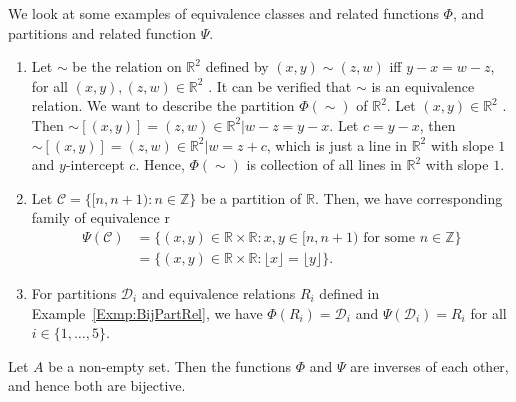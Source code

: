\documentclass[a4paper,english,12pt]{article}
\begin{document}
\begin{exmp} We look at some examples of equivalence classes and related functions $\Phi$, and partitions and related function $\Psi$.
	\begin{enumerate}
		\item Let $\sim$ be the relation on $\mathbb{R}^2$ defined by $(x, y) \sim (z, w)$ iff $y-x =
w-z$, for all $(x, y), (z, w) \in \mathbb{R}^2$ . It can be verified that $\sim$ is an equivalence relation. We
want to describe the partition $\Phi(\sim)$ of $\mathbb{R}^2$. Let $(x, y) \in \mathbb{R}^2$ . Then $\sim[(x, y)] = {(z, w) \in \mathbb{R}^2 | w − z = y − x}$. Let $c = y − x$, then $\sim[(x, y)] = {(z, w) \in \mathbb{R}^2 | w = z + c}$, which is just a line in $\mathbb{R}^2$ with slope $1$ and $y$-intercept $c$. Hence, $\Phi(\sim)$ is collection of all lines in $\mathbb{R}^2$ with slope $1$.
		\item Let $\mathcal{C} = \{[n, n + 1) : n \in \mathbb{Z}\}$ be a partition of $\mathbb{R}$. Then, we have corresponding family of equivalence r
		\begin{align*}
		\Psi(\mathcal{C}) &= \{(x,y) \in \mathbb{R} \times \mathbb{R}: x,y \in [n,n+1) \text{ for some } n \in \mathbb{Z}\}\\ &= \{(x,y) \in \mathbb{R} \times \mathbb{R}: \lfloor x \rfloor = \lfloor y \rfloor\}.
		\end{align*}
		\item For partitions $\mathcal{D}_i$ and equivalence relations $R_i$ defined in Example~\ref{Exmp:BijPartRel}, we have $\Phi(R_i) = \mathcal{D}_i$ and $\Psi(\mathcal{D}_i) = R_i$ for all $i \in \{1, \ldots, 5\}$. 
	\end{enumerate}
\end{exmp}

\begin{thm} Let $A$ be a non-empty set. Then the functions $\Phi$ and $\Psi$ are inverses of each other, and hence both are bijective.	
\end{thm}
\end{document}
